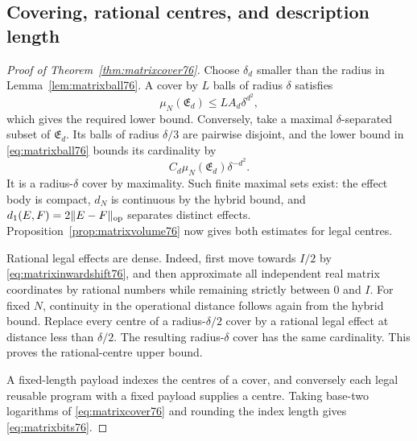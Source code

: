 \subsection{Covering, rational centres, and description length}
\begin{proof}[Proof of Theorem~\ref{thm:matrixcover76}]
Choose $\delta_d$ smaller than the radius in
Lemma~\ref{lem:matrixball76}. A cover by $L$ balls of radius
$\delta$ satisfies
\[
 \mu_N(\mathfrak E_d)\le LA_d\delta^{d^2},
\]
which gives the required lower bound. Conversely, take a maximal
$\delta$-separated subset of $\mathfrak E_d$. Its balls of radius
$\delta/3$ are pairwise disjoint, and the lower bound in
\eqref{eq:matrixball76} bounds its cardinality by
\[
 C_d\mu_N(\mathfrak E_d)\delta^{-d^2}.
\]
It is a radius-$\delta$ cover by maximality. Such finite maximal
sets exist: the effect body is compact, $d_N$ is continuous by the
hybrid bound, and $d_1(E,F)=2\|E-F\|_{\rm op}$ separates distinct
effects. Proposition~\ref{prop:matrixvolume76} now gives both
estimates for legal centres.

Rational legal effects are dense. Indeed, first move towards $I/2$
by \eqref{eq:matrixinwardshift76}, and then approximate all independent
real matrix coordinates by rational numbers while remaining strictly
between $0$ and $I$. For fixed $N$, continuity in the operational
distance follows again from the hybrid bound. Replace every centre
of a radius-$\delta/2$ cover by a rational legal effect at distance
less than $\delta/2$. The resulting radius-$\delta$ cover has the
same cardinality. This proves the rational-centre upper bound.

A fixed-length payload indexes the centres of a cover, and conversely
each legal reusable program with a fixed payload supplies a centre.
Taking base-two logarithms of \eqref{eq:matrixcover76} and rounding
the index length gives \eqref{eq:matrixbits76}.
\end{proof}
